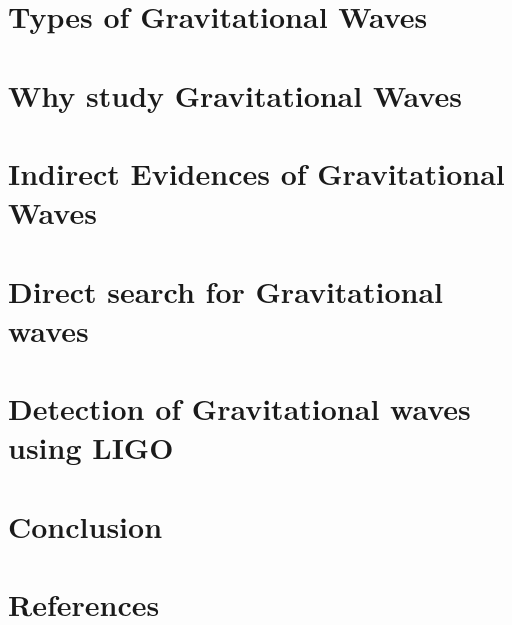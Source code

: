 \documentclass[11pt, a4paper]{article}
\begin{document}
\section{Types of Gravitational Waves}


\section{Why study Gravitational Waves}


\section{Indirect Evidences of Gravitational Waves}


\section{Direct search for Gravitational waves}






\section{Detection of Gravitational waves using LIGO }



\section{Conclusion}




\section{References}

\end{document}
